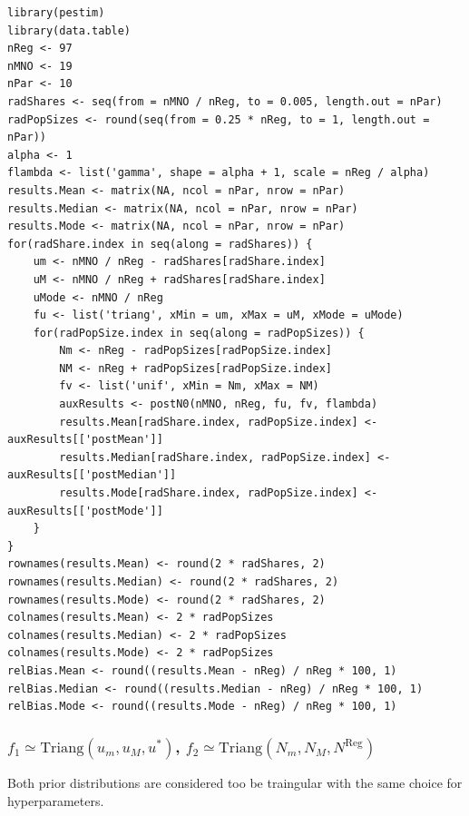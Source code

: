 \documentclass[12pt, a4paper]{article}
\begin{document}
\begin{verbatim}
library(pestim)
library(data.table)
nReg <- 97
nMNO <- 19
nPar <- 10
radShares <- seq(from = nMNO / nReg, to = 0.005, length.out = nPar)
radPopSizes <- round(seq(from = 0.25 * nReg, to = 1, length.out = nPar))
alpha <- 1
flambda <- list('gamma', shape = alpha + 1, scale = nReg / alpha)
results.Mean <- matrix(NA, ncol = nPar, nrow = nPar)
results.Median <- matrix(NA, ncol = nPar, nrow = nPar)
results.Mode <- matrix(NA, ncol = nPar, nrow = nPar)
for(radShare.index in seq(along = radShares)) {
    um <- nMNO / nReg - radShares[radShare.index]
    uM <- nMNO / nReg + radShares[radShare.index]
    uMode <- nMNO / nReg
    fu <- list('triang', xMin = um, xMax = uM, xMode = uMode)
    for(radPopSize.index in seq(along = radPopSizes)) {
        Nm <- nReg - radPopSizes[radPopSize.index]
        NM <- nReg + radPopSizes[radPopSize.index]
        fv <- list('unif', xMin = Nm, xMax = NM)
        auxResults <- postN0(nMNO, nReg, fu, fv, flambda)
        results.Mean[radShare.index, radPopSize.index] <- auxResults[['postMean']] 
        results.Median[radShare.index, radPopSize.index] <- auxResults[['postMedian']]
        results.Mode[radShare.index, radPopSize.index] <- auxResults[['postMode']]
    }
}
rownames(results.Mean) <- round(2 * radShares, 2)
rownames(results.Median) <- round(2 * radShares, 2)
rownames(results.Mode) <- round(2 * radShares, 2)
colnames(results.Mean) <- 2 * radPopSizes
colnames(results.Median) <- 2 * radPopSizes
colnames(results.Mode) <- 2 * radPopSizes
relBias.Mean <- round((results.Mean - nReg) / nReg * 100, 1)
relBias.Median <- round((results.Median - nReg) / nReg * 100, 1)
relBias.Mode <- round((results.Mode - nReg) / nReg * 100, 1)
\end{verbatim}


\subsubsection{$f_{1}\simeq\textrm{Triang}(u_{m}, u_{M}, u^{*})$, $f_{2}\simeq\textrm{Triang}(N_{m}, N_{M}, N^{\textrm{Reg}})$}

Both prior distributions are considered too be traingular with the same choice for hyperparameters.
\end{document}
